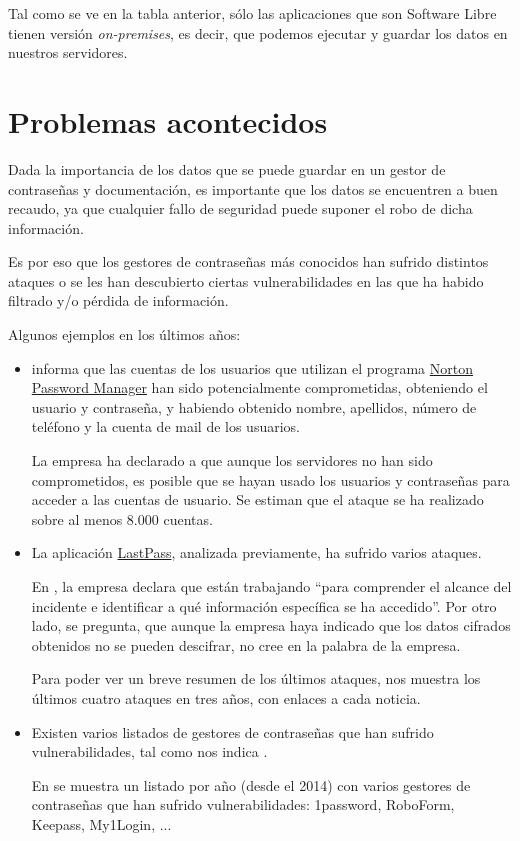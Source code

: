 \documentclass{\ClassPath/viu-tfm-template}
\begin{document}
Tal como se ve en la tabla anterior, sólo las aplicaciones que son Software Libre tienen versión \textit{on-premises}, es decir, que podemos ejecutar y guardar los datos en nuestros servidores.


\section{Problemas acontecidos}

Dada la importancia de los datos que se puede guardar en un gestor de contraseñas y documentación, es importante que los datos se encuentren a buen recaudo, ya que cualquier fallo de seguridad puede suponer el robo de dicha información.

Es por eso que los gestores de contraseñas más conocidos han sufrido distintos ataques o se les han descubierto ciertas vulnerabilidades en las que ha habido filtrado y/o pérdida de información.

Algunos ejemplos en los últimos años:

\begin{itemize}
    \item \textcite{norton} informa que las cuentas de los usuarios que utilizan el programa \href{https://us.norton.com/feature/password-manager}{Norton Password Manager} han sido potencialmente comprometidas, obteniendo el usuario y contraseña, y habiendo obtenido nombre, apellidos, número de teléfono y la cuenta de mail de los usuarios.

    La empresa ha declarado a \textcite{norton2} que aunque los servidores no han sido comprometidos, es posible que se hayan usado los usuarios y contraseñas para acceder a las cuentas de usuario. Se estiman que el ataque se ha realizado sobre al menos 8.000 cuentas.

    \item La aplicación \href{https://www.lastpass.com/}{LastPass}, analizada previamente, ha sufrido varios ataques.

    En \textcite{lastpass}, la empresa declara que están trabajando “para comprender el alcance del incidente e identificar a qué información específica se ha accedido”. Por otro lado, \textcite{lastpass2} se pregunta, que aunque la empresa haya indicado que los datos cifrados obtenidos no se pueden descifrar, no cree en la palabra de la empresa.

    Para poder ver un breve resumen de los últimos ataques, \textcite{lastpass3} nos muestra los últimos cuatro ataques en tres años, con enlaces a cada noticia.

    \item Existen varios listados de gestores de contraseñas que han sufrido vulnerabilidades, tal como nos indica \textcite{hacked2}.

    En \textcite{hacked} se muestra un listado por año (desde el 2014) con varios gestores de contraseñas que han sufrido vulnerabilidades: 1password, RoboForm, Keepass, My1Login, ...

\end{itemize}
\end{document}
